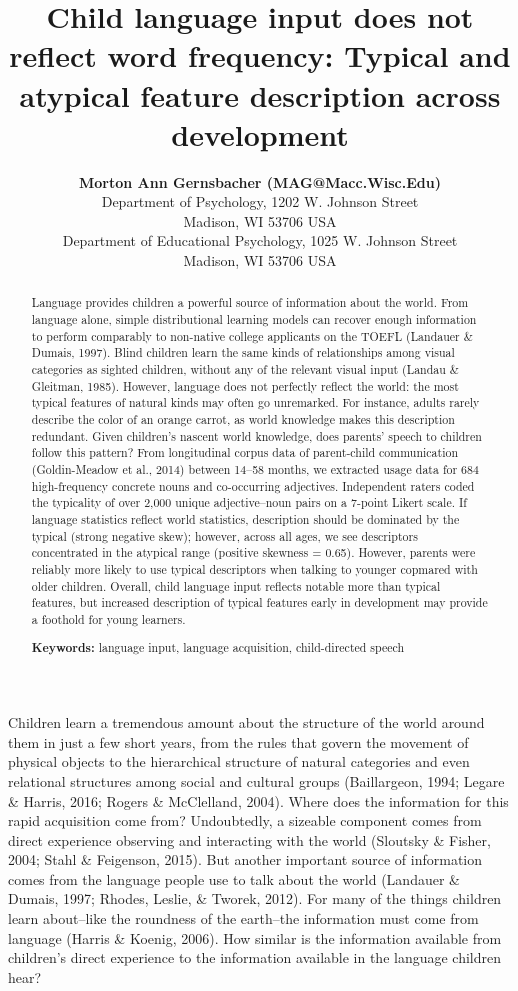 \documentclass[10pt, letterpaper]{article}
\title{Child language input does not reflect word frequency: Typical and
atypical feature description across development}
\author{{\large \bf Morton Ann Gernsbacher (MAG@Macc.Wisc.Edu)} \\ Department of Psychology, 1202 W. Johnson Street \\ Madison, WI 53706 USA \AND {\large \bf Sharon J.~Derry (SDJ@Macc.Wisc.Edu)} \\ Department of Educational Psychology, 1025 W. Johnson Street \\ Madison, WI 53706 USA}
\begin{document}
\maketitle

\begin{abstract}
Language provides children a powerful source of information about the
world. From language alone, simple distributional learning models can
recover enough information to perform comparably to non-native college
applicants on the TOEFL (Landauer \& Dumais, 1997). Blind children learn
the same kinds of relationships among visual categories as sighted
children, without any of the relevant visual input (Landau \& Gleitman,
1985). However, language does not perfectly reflect the world: the most
typical features of natural kinds may often go unremarked. For instance,
adults rarely describe the color of an orange carrot, as world knowledge
makes this description redundant. Given children's nascent world
knowledge, does parents' speech to children follow this pattern? From
longitudinal corpus data of parent-child communication (Goldin-Meadow et
al., 2014) between 14--58 months, we extracted usage data for 684
high-frequency concrete nouns and co-occurring adjectives. Independent
raters coded the typicality of over 2,000 unique adjective--noun pairs
on a 7-point Likert scale. If language statistics reflect world
statistics, description should be dominated by the typical (strong
negative skew); however, across all ages, we see descriptors
concentrated in the atypical range (positive skewness = 0.65). However,
parents were reliably more likely to use typical descriptors when
talking to younger copmared with older children. Overall, child language
input reflects notable more than typical features, but increased
description of typical features early in development may provide a
foothold for young learners.

\textbf{Keywords:}
language input, language acquisition, child-directed speech
\end{abstract}

Children learn a tremendous amount about the structure of the world
around them in just a few short years, from the rules that govern the
movement of physical objects to the hierarchical structure of natural
categories and even relational structures among social and cultural
groups (Baillargeon, 1994; Legare \& Harris, 2016; Rogers \& McClelland,
2004). Where does the information for this rapid acquisition come from?
Undoubtedly, a sizeable component comes from direct experience observing
and interacting with the world (Sloutsky \& Fisher, 2004; Stahl \&
Feigenson, 2015). But another important source of information comes from
the language people use to talk about the world (Landauer \& Dumais,
1997; Rhodes, Leslie, \& Tworek, 2012). For many of the things children
learn about--like the roundness of the earth--the information must come
from language (Harris \& Koenig, 2006). How similar is the information
available from children's direct experience to the information available
in the language children hear?
\end{document}
